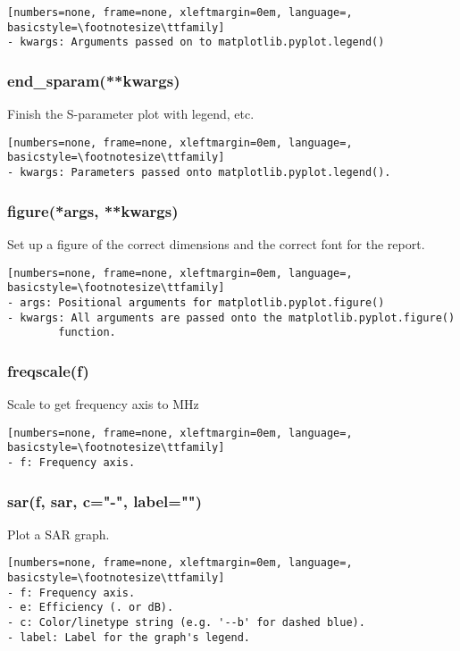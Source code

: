 \begin{lstlisting}[numbers=none, frame=none, xleftmargin=0em, language=, basicstyle=\footnotesize\ttfamily]
- kwargs: Arguments passed on to matplotlib.pyplot.legend()
\end{lstlisting}

\subsubsection{end\_sparam(**kwargs)}
Finish the S-parameter plot with legend, etc.

\begin{lstlisting}[numbers=none, frame=none, xleftmargin=0em, language=, basicstyle=\footnotesize\ttfamily]
- kwargs: Parameters passed onto matplotlib.pyplot.legend().
\end{lstlisting}

\subsubsection{figure(*args, **kwargs)}
Set up a figure of the correct dimensions and the correct font for the
report.

\begin{lstlisting}[numbers=none, frame=none, xleftmargin=0em, language=, basicstyle=\footnotesize\ttfamily]
- args: Positional arguments for matplotlib.pyplot.figure()
- kwargs: All arguments are passed onto the matplotlib.pyplot.figure()
        function.
\end{lstlisting}

\subsubsection{freqscale(f)}
Scale to get frequency axis to MHz

\begin{lstlisting}[numbers=none, frame=none, xleftmargin=0em, language=, basicstyle=\footnotesize\ttfamily]
- f: Frequency axis.
\end{lstlisting}

\subsubsection{sar(f, sar, c="-", label="")}
Plot a SAR graph.

\begin{lstlisting}[numbers=none, frame=none, xleftmargin=0em, language=, basicstyle=\footnotesize\ttfamily]
- f: Frequency axis.
- e: Efficiency (. or dB).
- c: Color/linetype string (e.g. '--b' for dashed blue).
- label: Label for the graph's legend.
\end{lstlisting}

